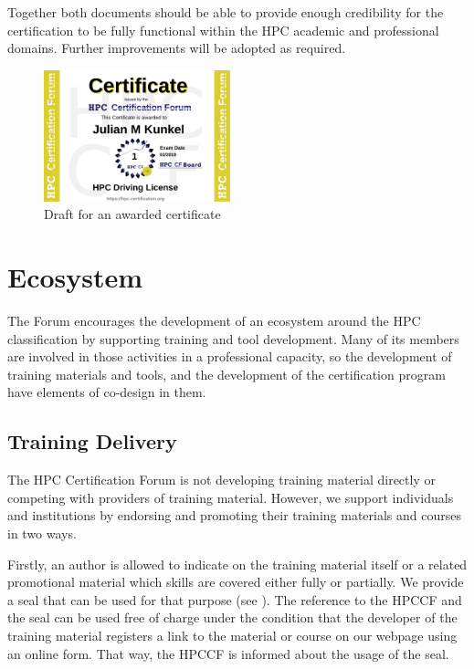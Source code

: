 \documentclass[jocse]{jocseart}
\begin{document}
Together both documents should be able to provide enough credibility for the certification to be fully functional within the HPC academic and professional domains. Further improvements will be adopted as required. 

\begin{figure}
  \includegraphics[width=0.48\textwidth]{JulianMKunkel}
  \caption{Draft for an awarded certificate}
  \label{fig:awardedCertificate}
\end{figure}

\section{Ecosystem}
\label{sec:ecosystem}

The Forum encourages the development of an ecosystem around the HPC classification by supporting training and tool development. Many of its members are involved in those activities in a professional capacity, so the development of training materials and tools, and the development of the certification program have elements of co-design in them. 

\subsection{Training Delivery}

The HPC Certification Forum is not developing training material directly or competing with providers of training material.
However, we support individuals and institutions by endorsing and promoting their training materials and courses in two ways.

Firstly, an author is allowed to indicate on the training material itself or a related promotional material which skills are covered either fully or partially.
We provide a seal that can be used for that purpose (see ).
The reference to the HPCCF and the seal can be used free of charge under the condition that the developer of the training material registers a link to the material or course on our webpage using an online form. %
That way, the HPCCF is informed about the usage of the seal.
\end{document}
